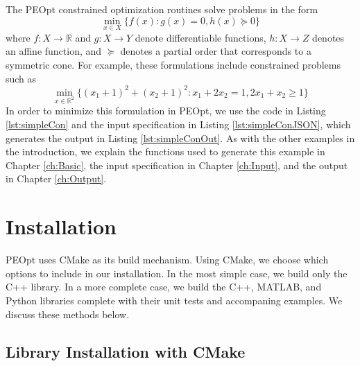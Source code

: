 \documentclass{report}
\newcommand{\re}{\mathbb{R}}
\begin{document}
        The PEOpt constrained optimization routines solve problems in the form
$$
        \min_{x\in X} \{ f(x) : g(x)=0, h(x)\succeq 0 \}
$$
where $f:X\rightarrow \re$ and $g:X\rightarrow Y$ denote differentiable functions, $h:X\rightarrow Z$ denotes an affine function, and $\succeq$ denotes a partial order that corresponds to a symmetric cone.  For example, these formulations include constrained problems such as 
$$
        \min_{x\in\re^2}\{(x_1+1)^2+(x_2+1)^2 :  x_1 + 2x_2 = 1, 2x_1 + x_2 \geq 1 \} 
$$
In order to minimize this formulation in PEOpt, we use the code in Listing \ref{lst:simpleCon} and the input specification in Listing \ref{lst:simpleConJSON}, which generates the output in Listing \ref{lst:simpleConOut}.  As with the other examples in the introduction, we explain the functions used to generate this example in Chapter \ref{ch:Basic}, the input specification in Chapter \ref{ch:Input}, and the output in Chapter \ref{ch:Output}.





\chapter{Installation}\label{ch:Install}

    PEOpt uses CMake as its build mechanism.  Using CMake, we choose which options to include in our installation.  In the most simple case, we build only the C++ library.  In a more complete case, we build the C++, MATLAB, and Python libraries complete with their unit tests and accompaning examples.  We discuss these methods below.
    
\section{Library Installation with CMake}
\end{document}
